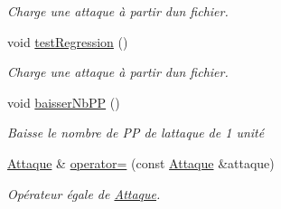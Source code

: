 \begin{DoxyCompactItemize}
\begin{DoxyCompactList}\small\item\em Charge une attaque à partir d\textquotesingle{}un fichier. \end{DoxyCompactList}\item 
void \hyperlink{class_attaque_a8017dbfbf4af62e113d27d093a2786c6}{test\+Regression} ()
\begin{DoxyCompactList}\small\item\em Charge une attaque à partir d\textquotesingle{}un fichier. \end{DoxyCompactList}\item 
void \hyperlink{class_attaque_ad6320c58f467865c778aae13c75c558f}{baisser\+Nb\+PP} ()
\begin{DoxyCompactList}\small\item\em Baisse le nombre de PP de l\textquotesingle{}attaque de 1 unité \end{DoxyCompactList}\item 
\hyperlink{class_attaque}{Attaque} \& \hyperlink{class_attaque_a21b14fe41db692f8e38aa1821a3519b9}{operator=} (const \hyperlink{class_attaque}{Attaque} \&attaque)
\begin{DoxyCompactList}\small\item\em Opérateur égale de \hyperlink{class_attaque}{Attaque}. \end{DoxyCompactList}\end{DoxyCompactItemize}

